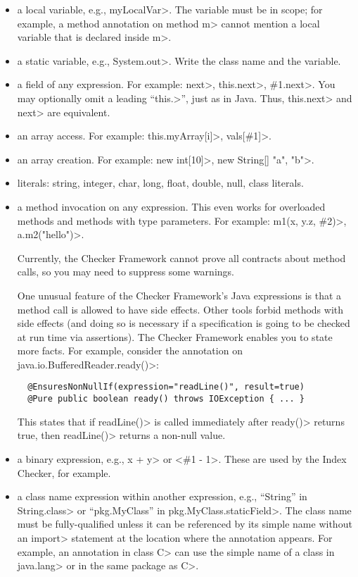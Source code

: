 \begin{itemize}
\item
  a local variable, e.g., \<myLocalVar>.
  The variable must be in scope; for example, a method annotation on method
  \<m> cannot mention a local variable that is declared inside \<m>.

\item
  a static variable, e.g., \<System.out>.
  Write the class name and the variable.

\item
  a field of any expression.  For example:  \<next>,
  \<this.next>, \<\#1.next>. %
  You may optionally omit a leading ``\<this.>'', just as in Java.  Thus,
  \<this.next> and \<next> are equivalent.

\item
  an array access.  For example:  \<this.myArray[i]>, \<vals[\#1]>.

\item
  an array creation. For example: \<new int[10]>, \<new String[] {"a", "b"}>.

\item literals: string, integer, char, long, float, double, null, class literals.

\item a method invocation on any expression.
  This even works for overloaded methods and methods with type parameters.
  For example:
  \<m1(x, y.z, \#2)>, \<a.m2("hello")>.

  Currently, the Checker Framework cannot prove all contracts about method
  calls, so you may need to suppress some warnings.

  One unusual feature of the Checker Framework's Java expressions is that a
  method call is allowed to have side effects.  Other tools forbid methods
  with side effects (and doing so is necessary if a specification is going
  to be checked at run time via assertions).  The Checker Framework enables
  you to state more facts.  For example, consider the annotation on
  \<java.io.BufferedReader.ready()>:

\begin{Verbatim}
  @EnsuresNonNullIf(expression="readLine()", result=true)
  @Pure public boolean ready() throws IOException { ... }
\end{Verbatim}

  This states that if \<readLine()> is called immediately after \<ready()>
  returns true, then \<readLine()> returns a non-null value.

\item a binary expression, e.g., \<x + y> or <\#1 - 1>.  These are used by
  the Index Checker, for example.

\item a class name expression within another expression, e.g., ``String''
  in \<String.class> or ``pkg.MyClass'' in \<pkg.MyClass.staticField>.  The
  class name must be fully-qualified unless it can be referenced by its
  simple name without an \<import> statement at the location where the
  annotation appears.  For example, an annotation in class \<C> can use the
  simple name of a class in \<java.lang> or in the same package as \<C>.

\end{itemize}

